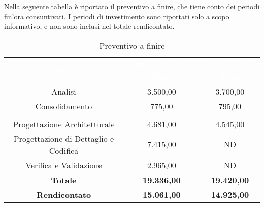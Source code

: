 Nella seguente tabella è riportato il preventivo a finire, che tiene conto dei periodi fin'ora consuntivati. I periodi di investimento sono riportati solo a scopo informativo, e non sono inclusi nel totale rendicontato.

\begin{table}[H]
	\centering
	\begin{tabular}{ccc}
	\rowcolor{greySWEight}
	\textcolor{white}{\textbf{Periodo}} &
	\textcolor{white}{\textbf{Preventivo in Euro}} & 
	\textcolor{white}{\textbf{Costo in Euro}} \\
	Analisi & 3.500,00 & 3.700,00 \\
	Consolidamento & 775,00 & 795,00 \\
	\rowcolor{greySWEight}
	\multicolumn{3}{c}{ \textcolor{white}{\textbf{Rendicontato}} } \\
	Progettazione Architetturale & 4.681,00 & 4.545,00 \\
	Progettazione di Dettaglio e Codifica & 7.415,00 & ND \\
	Verifica e Validazione & 2.965,00 & ND \\
	\hline	
	\textbf{Totale} & \textbf{19.336,00} & \textbf{19.420,00} \\
	\textbf{Rendicontato} & \textbf{15.061,00} & \textbf{14.925,00} \\
	\end{tabular}
	\caption{Preventivo a finire}
\end{table}
